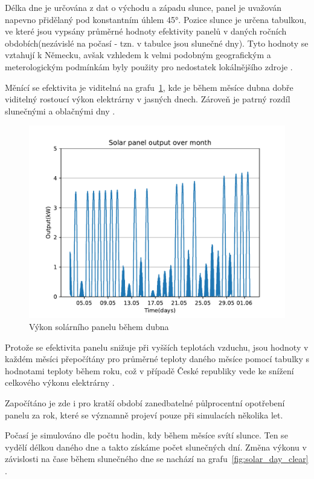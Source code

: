 \documentclass[12pt,a4paper]{Cotmas-2018}
\begin{document}
Délka dne je určována z dat o východu a západu slunce, panel je uvažován napevno přidělaný pod konstantním úhlem 45°.
Pozice slunce je určena tabulkou, ve které jsou vypsány průměrné hodnoty efektivity panelů v daných ročních obdobích(nezávislé na počasí - tzn. v tabulce jsou slunečné dny). Tyto hodnoty se vztahují k Německu, avšak vzhledem k velmi podobným geografickým a meterologickým podmínkám byly použity pro nedostatek lokálnějšího zdroje 
\cite{German-solar-hourly-2014}.

 Měnící se efektivita je viditelná na grafu~\ref{fig:solar_month}, kde je během měsíce dubna dobře viditelný rostoucí výkon elektrárny v jasných dnech. Zároveň je patrný rozdíl slunečnými a oblačnými dny \cite{PF-Bach-2022}.

\begin{figure}
\includegraphics[width=\linewidth]{img/solar_month.pdf}
\caption{Výkon solárního panelu během dubna}
\label{fig:solar_month}
\end{figure}

Protože se efektivita panelu snižuje při vyšších teplotách vzduchu, jsou hodnoty v každém měsíci přepočítány pro průměrné teploty daného měsíce pomocí tabulky s hodnotami teploty během roku, což v případě České republiky vede ke snížení celkového výkonu elektrárny \cite{Cotmas-2018}.

Započítáno je zde i pro kratší období zanedbatelné půlprocentní opotřebení panelu za rok, které se významně projeví pouze při simulacích několika let.

Počasí je simulováno dle počtu hodin, kdy během měsíce svítí slunce. Ten se vydělí délkou daného dne a takto získáme počet slunečných dní. Změna výkonu  v závislosti na čase během slunečného dne se nachází na grafu~\ref{fig:solar_day_clear} \cite{Journal-of-PV-2020}.
\end{document}
